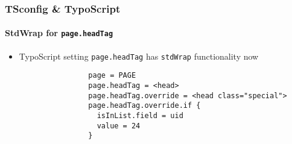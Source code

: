 %

\begin{frame}[fragile]
	\frametitle{TSconfig \& TypoScript}
	\framesubtitle{StdWrap for \texttt{page.headTag}}

	\begin{itemize}
		\item TypoScript setting \texttt{page.headTag} has \texttt{stdWrap} functionality now

			\begin{lstlisting}
				page = PAGE
				page.headTag = <head>
				page.headTag.override = <head class="special">
				page.headTag.override.if {
		  		  isInList.field = uid
		  		  value = 24
				}
			\end{lstlisting}

	\end{itemize}

\end{frame}


